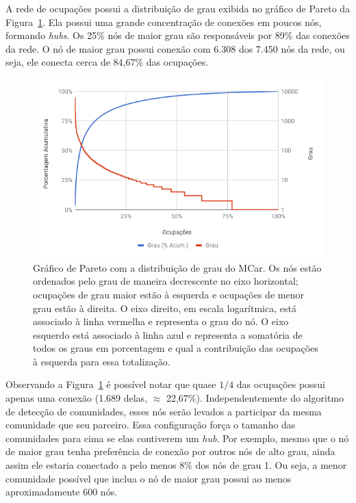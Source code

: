 \documentclass[
  article,
  11pt,
  a4paper,
  english,
  brazil,
  sumario=tradicional]{abntex2}
\begin{document}
A rede de ocupações possui a distribuição de grau exibida no gráfico de Pareto da Figura~\ref{fig:pareto-ocupacoes}. Ela possui uma grande concentração de conexões em poucos nós, formando \textit{hubs}. Os 25\% nós de maior grau são responsáveis por 89\% das conexões da rede. O nó de maior grau possui conexão com 6.308 dos 7.450 nós da rede, ou seja, ele conecta cerca de 84,67\% das ocupações.


\begin{figure}[htb]
  \centering
  \includegraphics[width=0.9\linewidth]{pareto-ocupacoes.png}
  \caption{Gráfico de Pareto com a distribuição de grau do MCar. Os nós estão ordenados pelo grau de maneira decrescente no eixo horizontal; ocupações de grau maior estão à esquerda e ocupações de menor grau estão à direita. O eixo direito, em escala logarítmica, está associado à linha vermelha e representa o grau do nó. O eixo esquerdo está associado à linha azul e representa a somatória de todos os graus em porcentagem e qual a contribuição das ocupações à esquerda para essa totalização.}
  \label{fig:pareto-ocupacoes}
\end{figure}


Observando a Figura~\ref{fig:pareto-ocupacoes} é possível notar que quase $1/4$ das ocupações possui apenas uma conexão (1.689 delas, $\approx$ 22,67\%). Independentemente do algoritmo de detecção de comunidades, esses nós serão levados a participar da mesma comunidade que seu parceiro. Essa configuração força o tamanho das comunidades para cima se elas contiverem um \textit{hub}. Por exemplo, mesmo que o nó de maior grau tenha preferência de conexão por outros nós de alto grau, ainda assim ele estaria conectado a pelo menos 8\% dos nós de grau 1. Ou seja, a menor comunidade possível que inclua o nó de maior grau possui ao menos aproximadamente 600 nós.
\end{document}
